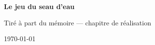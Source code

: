 \documentclass[11pt, a4paper, openany]{report}
\begin{document}
\begin{center}
  {\LARGE\bfseries Le jeu du seau d'eau\par}
  \vspace{4pt}
  {\large Tiré à part du mémoire — chapitre de réalisation\par}
  \vspace{2pt}
  {\small \today\par}
\end{center}
\vspace{12pt}



\printbibliography[heading=bibintoc, title={Bibliographie}]
\end{document}
